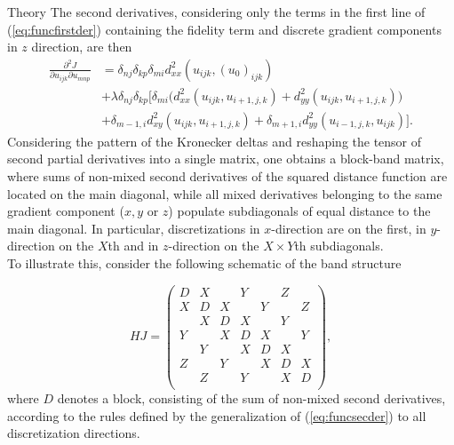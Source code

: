 \begin{chapter}{Theory}
The second derivatives, considering only the terms in the first line of (\ref{eq:funcfirstder}) containing the fidelity term and discrete gradient components in $z$ direction, are then
\begin{align}
    \label{eq:funcsecder}
    \frac{\partial^2 J}{\partial u_{ijk}\partial u_{mnp}} &=  \delta_{nj}\delta_{kp}\delta_{mi}d^2_{xx}(u_{ijk},(u_0)_{ijk}) \\
    &+\lambda\delta_{nj}\delta_{kp}
    \bigg[ 
	\delta_{mi} \bigg(d_{xx}^2(u_{ijk},u_{i+1,j,k}) +d_{yy}^2(u_{ijk},u_{i+1,j,k}) \bigg)\\
    &+  \delta_{m-1,i}d_{xy}^2(u_{ijk},u_{i+1,j,k}) +\delta_{m+1,i} d_{yy}^2(u_{i-1,j,k},u_{ijk})
    \bigg].
\end{align}
Considering the pattern of the Kronecker deltas and reshaping the tensor of second partial derivatives into a single matrix, one 
obtains a block-band matrix, where sums of non-mixed second derivatives of the squared distance function are located on the main diagonal, while all mixed
derivatives belonging to the same gradient component ($x,y$ or $z$) populate subdiagonals of equal distance to the main diagonal.
In particular, discretizations in $x$-direction are on the first, in $y$-direction on the $X$th and in $z$-direction on the $X\times Y$th subdiagonals.\\

To illustrate this, consider the following schematic of the band structure

\begin{equation}
    HJ=
\begin{pmatrix}
D	& X	    & 		& Y	    & 		& Z	    & 	   \\
X	& D	    & X		& 	    & Y		& 	    & Z	  \\
	& X	    & D	    & X	    & 		& Y	    & 	 \\
Y	& 	    & X		& D	    & X		& 	    & Y	\\
	& Y	    & 		& X	    & D		& X	    & 	\\
Z	& 	    & Y		& 	    & X		& D	    & X	\\
	& Z	    & 		& Y	    & 		& X	    & D	\\
\end{pmatrix},
\end{equation}
where $D$ denotes a block, consisting of the sum of non-mixed second derivatives, according to the rules defined by the generalization of (\ref{eq:funcsecder}) to all 
discretization directions.\\


\end{chapter}
